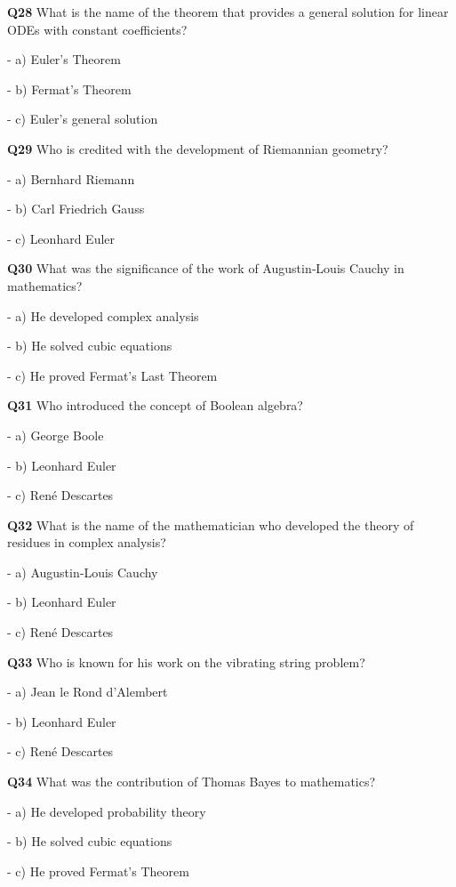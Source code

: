 \textbf{Q28} What is the name of the theorem that provides a general solution for linear ODEs with constant coefficients?\par
\quad - a) Euler's Theorem\par
\quad - b) Fermat's Theorem\par
\quad - c) Euler's general solution\par

\textbf{Q29} Who is credited with the development of Riemannian geometry?\par
\quad - a) Bernhard Riemann\par
\quad - b) Carl Friedrich Gauss\par
\quad - c) Leonhard Euler\par

\textbf{Q30} What was the significance of the work of Augustin‑Louis Cauchy in mathematics?\par
\quad - a) He developed complex analysis\par
\quad - b) He solved cubic equations\par
\quad - c) He proved Fermat's Last Theorem\par

\textbf{Q31} Who introduced the concept of Boolean algebra?\par
\quad - a) George Boole\par
\quad - b) Leonhard Euler\par
\quad - c) René Descartes\par

\textbf{Q32} What is the name of the mathematician who developed the theory of residues in complex analysis?\par
\quad - a) Augustin‑Louis Cauchy\par
\quad - b) Leonhard Euler\par
\quad - c) René Descartes\par

\textbf{Q33} Who is known for his work on the vibrating string problem?\par
\quad - a) Jean le Rond d'Alembert\par
\quad - b) Leonhard Euler\par
\quad - c) René Descartes\par

\textbf{Q34} What was the contribution of Thomas Bayes to mathematics?\par
\quad - a) He developed probability theory\par
\quad - b) He solved cubic equations\par
\quad - c) He proved Fermat's Theorem\par

